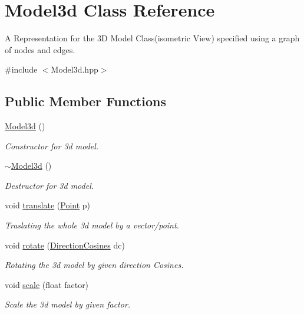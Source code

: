 \hypertarget{class_model3d}{}\section{Model3d Class Reference}
\label{class_model3d}


A Representation for the 3D Model Class(isometric View) specified using a graph of nodes and edges.  




{\ttfamily \#include $<$Model3d.\+hpp$>$}

\subsection*{Public Member Functions}
\begin{DoxyCompactItemize}
\item 
\mbox{\hyperlink{class_model3d_a134d35fcc3e1097f4e8471a98a5f566b}{Model3d}} ()
\begin{DoxyCompactList}\small\item\em Constructor for 3d model. \end{DoxyCompactList}\item 
\mbox{\hyperlink{class_model3d_a7a4ec3be34c901538574d99d95a46b04}{$\sim$\+Model3d}} ()
\begin{DoxyCompactList}\small\item\em Destructor for 3d model. \end{DoxyCompactList}\item 
void \mbox{\hyperlink{class_model3d_a763ebbdb844e7c934f7dc6935934586a}{translate}} (\mbox{\hyperlink{class_point}{Point}} p)
\begin{DoxyCompactList}\small\item\em Traslating the whole 3d model by a vector/point. \end{DoxyCompactList}\item 
void \mbox{\hyperlink{class_model3d_afe2b497ef9666f0a8b96c8b2de97e7f7}{rotate}} (\mbox{\hyperlink{class_direction_cosines}{Direction\+Cosines}} dc)
\begin{DoxyCompactList}\small\item\em Rotating the 3d model by given direction Cosines. \end{DoxyCompactList}\item 
void \mbox{\hyperlink{class_model3d_a719baa4f43208450d99eb755465e55fa}{scale}} (float factor)
\begin{DoxyCompactList}\small\item\em Scale the 3d model by given factor. \end{DoxyCompactList}\item 

\end{DoxyCompactItemize}
